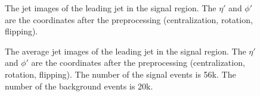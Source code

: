 \documentclass[12pt]{article}
\begin{document}
		\begin{figure}[htpb]
			\centering
			\caption{The jet images of the leading jet in the signal region. The $\eta'$ and $\phi'$ are the coordinates after the preprocessing (centralization, rotation, flipping).}
			\label{fig:HVmodel_jet_image_one_event}
		\end{figure}
		\begin{figure}[htpb]
			\centering
			\caption{The average jet images of the leading jet in the signal region. The $\eta'$ and $\phi'$ are the coordinates after the preprocessing (centralization, rotation, flipping). The number of the signal events is 56k. The number of the background events is 20k.}
			\label{fig:HVmodel_jet_image_average}
		\end{figure}
\end{document}
